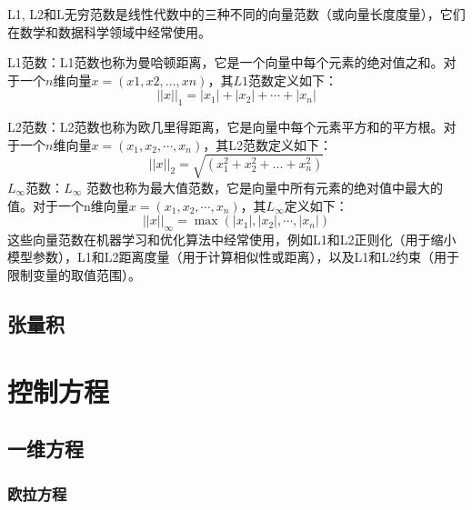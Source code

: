 \documentclass{article}
\numberwithin{equation}{subsection}    %
\begin{document}
\begin{appendix}
    L1, L2和L无穷范数是线性代数中的三种不同的向量范数（或向量长度度量），它们在数学和数据科学领域中经常使用。

    L1范数：L1范数也称为曼哈顿距离，它是一个向量中每个元素的绝对值之和。对于一个$n$维向量$x = (x1, x2, ..., xn)$，其$L1$范数定义如下：
    \begin{equation}
        ||x||_1 = |x_1| + |x_2| + \cdots + |x_n|
    \end{equation}

    L2范数：L2范数也称为欧几里得距离，它是向量中每个元素平方和的平方根。对于一个$n$维向量$x = (x_1, x_2,\cdots, x_n)$，其L2范数定义如下：
    \begin{equation}
        ||x||_2 = \sqrt{(x_1^2 + x_2^2 + ... + x_n^2)}
    \end{equation}
    $L_\infty$范数：$L_\infty$ 范数也称为最大值范数，它是向量中所有元素的绝对值中最大的值。对于一个n维向量$x = (x_1, x_2,\cdots, x_n)$，其$L_\infty$定义如下：
    \begin{equation}
        ||x||_\infty = \max(|x_1|, |x_2|,\cdots, |x_n|)
    \end{equation}
    这些向量范数在机器学习和优化算法中经常使用，例如L1和L2正则化（用于缩小模型参数），L1和L2距离度量（用于计算相似性或距离），以及L1和L2约束（用于限制变量的取值范围）。
    \subsection{张量积}


    \newpage
    \section{控制方程}
    \subsection{一维方程}
    \subsubsection{欧拉方程}

\end{appendix}
\end{document}
